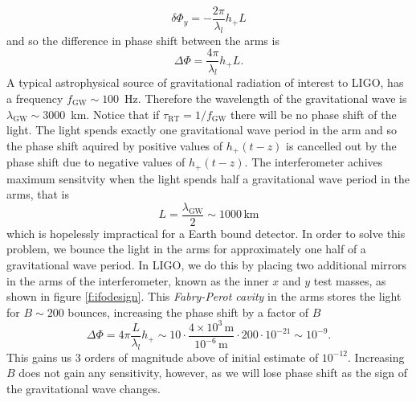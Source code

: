 \begin{equation}
\delta \Phi_y = - \frac{2\pi}{\lambda_l} h_{+} L
\end{equation}
and so the difference in phase shift between the arms is
\begin{equation}
\Delta \Phi = \frac{4\pi}{\lambda_l} h_{+} L.
\end{equation}
A typical astrophysical source of gravitational radiation of interest to LIGO,
has a frequency $f_\mathrm{GW} \sim 100$~Hz. Therefore the wavelength of the
gravitational wave is $\lambda_\mathrm{GW} \sim 3000$~km. Notice that if
$\tau_\mathrm{RT} = 1 / f_\mathrm{GW}$ there will be no phase shift of the
light. The light spends exactly one gravitational wave period in the arm and
so the phase shift aquired by positive values of $h_+(t-z)$ is cancelled out
by the phase shift due to negative values of $h_+(t-z)$. The interferometer
achives maximum sensitvity when the light spends half a gravitational wave
period in the arms, that is
\begin{equation}
L = \frac{\lambda_\mathrm{GW}}{2} \sim 1000\,\mathrm{km}
\end{equation}
which is hopelessly impractical for a Earth bound detector. In order to solve
this problem, we bounce the light in the arms for approximately one half of a
gravitational wave period. In LIGO, we do this by placing two additional
mirrors in the arms of the interferometer, known as the inner $x$ and $y$ test
masses, as shown in figure \ref{f:ifodesign}. This \emph{Fabry-Perot cavity}
in the arms stores the light for $B \sim 200$ bounces, increasing the phase
shift by a factor of $B$
\begin{equation}
\Delta \Phi = 4\pi \frac{L}{\lambda_l} h_{+} \sim 
10 \cdot \frac{4 \times 10^3\,\mathrm{m}}{10^{-6}\,\mathrm{m}} \cdot 200 \cdot
10^{-21} \sim 10^{-9}.
\end{equation}
This gains us 3 orders of magnitude above of initial estimate of $10^{-12}$.
Increasing $B$ does not gain any sensitivity, however, as we will lose phase
shift as the sign of the gravitational wave changes.

